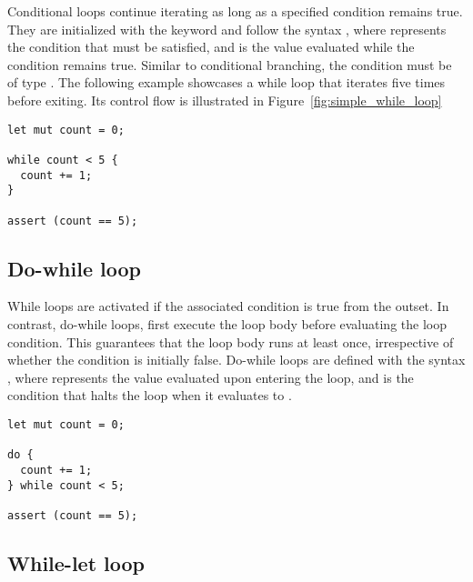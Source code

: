 Conditional loops continue iterating as long as a specified condition remains
true. They are initialized with the keyword  and follow the syntax
, where  represents the condition that must be
satisfied, and  is the value evaluated while the condition remains
true. Similar to conditional branching, the condition  must be of type
. The following example showcases a while loop that iterates five
times before exiting. Its control flow is illustrated in
Figure~\ref{fig:simple_while_loop}

\begin{lstlisting}[style=coloredverbatim, caption=Simple while loop, label=lst:simple_while_loop]
let mut count = 0;

while count < 5 {
  count += 1;
}

assert (count == 5);
\end{lstlisting}



\subsection{Do-while loop}
\label{sec:do_while_loop}

While loops are activated if the associated condition is true from the outset.
In contrast, do-while loops, first execute the loop body before evaluating the
loop condition. This guarantees that the loop body runs at least once,
irrespective of whether the condition is initially false. Do-while loops are
defined with the syntax , where  represents the
value evaluated upon entering the loop, and  is the condition that
halts the loop when it evaluates to .

\begin{lstlisting}[style=coloredverbatim, caption=Simple do while loop, label=lst:simple_do_while_loop]
let mut count = 0;

do {
  count += 1;
} while count < 5;

assert (count == 5);
\end{lstlisting}



\subsection{While-let loop}
\label{sec:while_let_loop}

